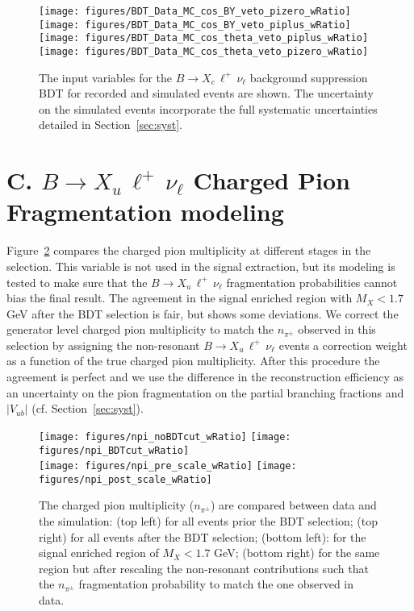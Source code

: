\documentclass[twocolumn,aps,prd,superscriptaddress,nofootinbib,floatfix,preprintnumbers,a4]{revtex4-1}
\newcommand{\bulnu}{\ensuremath{B \to X_u \, \ell^+\, \nu_{\ell}}\xspace}
\newcommand{\bclnu}{\ensuremath{B \to X_c \, \ell^+\, \nu_{\ell}}\xspace}
\begin{document}
\begin{appendix}
\begin{figure}[h!]
  \texttt{[image: figures/BDT\_Data\_MC\_cos\_BY\_veto\_pizero\_wRatio]} 
  \texttt{[image: figures/BDT\_Data\_MC\_cos\_BY\_veto\_piplus\_wRatio]}  \\
  \texttt{[image: figures/BDT\_Data\_MC\_cos\_theta\_veto\_piplus\_wRatio]}  
  \texttt{[image: figures/BDT\_Data\_MC\_cos\_theta\_veto\_pizero\_wRatio]} \\
\caption{
  The input variables for the \bclnu background suppression BDT for recorded and simulated events are shown. The uncertainty on the simulated events incorporate the full systematic uncertainties detailed in Section~\ref{sec:syst}.
 }
\label{fig:bdtvars_dataMC3}
\end{figure}  

\clearpage

\section*{C. \bulnu Charged Pion Fragmentation modeling}

Figure~\ref{fig:npicomp} compares the charged pion multiplicity at different stages in the selection. This variable is not used in the signal extraction, but its modeling is tested to make sure that the \bulnu fragmentation probabilities cannot bias the final result. The agreement in the signal enriched region with $M_{X} < 1.7$ GeV after the BDT selection is fair, but shows some deviations. We correct the generator level charged pion multiplicity to match the $n_{\pi^\pm}$ observed in this selection by assigning the non-resonant \bulnu events a correction weight as a function of the true charged pion multiplicity. After this procedure the agreement is perfect and we use the difference in the reconstruction efficiency as an uncertainty on the pion fragmentation on the partial branching fractions and $|V_{ub}|$ (cf. Section~\ref{sec:syst}).

\begin{figure}[h!]
  \texttt{[image: figures/npi\_noBDTcut\_wRatio]}  
  \texttt{[image: figures/npi\_BDTcut\_wRatio]} \\
  \texttt{[image: figures/npi\_pre\_scale\_wRatio]} 
  \texttt{[image: figures/npi\_post\_scale\_wRatio]} 
\caption{
   The charged pion multiplicity ($n_{\pi^\pm}$) are compared between data and the simulation: (top left) for all events prior the BDT selection; (top right) for all events after the BDT selection; (bottom left): for the signal enriched region of $M_{X} < 1.7$ GeV; (bottom right) for the same region but after rescaling the non-resonant contributions such that the $n_{\pi^\pm}$ fragmentation probability to match the one observed in data.
 }
\label{fig:npicomp}
\end{figure}


\end{appendix}
\end{document}

